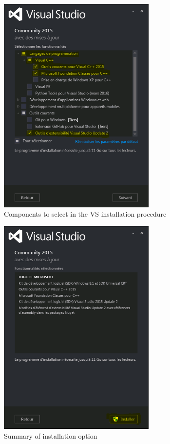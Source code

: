 \documentclass[10pt,a4paper]{article}
\begin{document}
\begin{figure}[!htbp]
  \center
  \includegraphics[width=0.7\textwidth]{Art/vs2015-select-components.png}
  \caption[]{Components to select in the VS installation procedure}
  \label{fig:vs2015-select-components}
\end{figure}

\begin{figure}[!htbp]
  \center
  \includegraphics[width=0.7\textwidth]{Art/vs2015-start-install.png}
  \caption[]{Summary of installation option}
  \label{fig:vs2015-start-install}
\end{figure}
\end{document}
